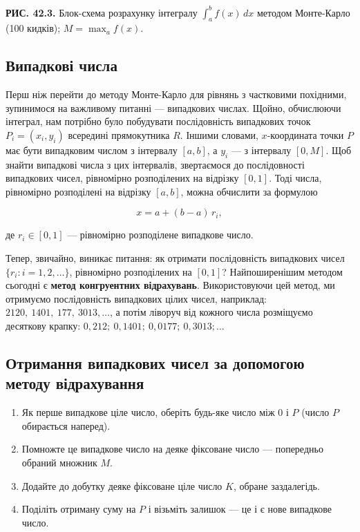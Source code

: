 \documentclass[
  ukrainian,
]{article}
\providecommand{\tightlist}{%
  \setlength{\itemsep}{0pt}\setlength{\parskip}{0pt}}
\begin{document}
\textbf{РИС. 42.3.} Блок-схема розрахунку інтегралу
\(\int_{a}^{b} f(x)\,dx\) методом Монте-Карло (100 кидків);
\(M = \max_a f(x)\).

\subsection{Випадкові
числа}\label{ux432ux438ux43fux430ux434ux43aux43eux432ux456-ux447ux438ux441ux43bux430}

Перш ніж перейти до методу Монте-Карло для рівнянь з частковими
похідними, зупинимося на важливому питанні --- випадкових числах. Щойно,
обчислюючи інтеграл, нам потрібно було побудувати послідовність
випадкових точок \(P_i = (x_i, y_i)\) всередині прямокутника \(R\).
Іншими словами, \(x\)-координата точки \(P\) має бути випадковим числом
з інтервалу \([a, b]\), а \(y_i\) --- з інтервалу \([0, M]\). Щоб знайти
випадкові числа з цих інтервалів, звертаємося до послідовності
випадкових чисел, рівномірно розподілених на відрізку \([0, 1]\). Тоді
числа, рівномірно розподілені на відрізку \([a, b]\), можна обчислити за
формулою

\[
x = a + (b - a)\,r_i,
\]

де \(r_i \in [0, 1]\) --- рівномірно розподілене випадкове число.

Тепер, звичайно, виникає питання: як отримати послідовність випадкових
чисел \(\{r_i: i=1,2,\ldots\}\), рівномірно розподілених на \([0,1]\)?
Найпоширенішим методом сьогодні є \textbf{метод конгруентних
відрахувань}. Використовуючи цей метод, ми отримуємо послідовність
випадкових цілих чисел, наприклад: \(2120,\ 1401,\ 177,\ 3013, \ldots\),
а потім ліворуч від кожного числа розміщуємо десяткову крапку:
\(0{,}212;\ 0{,}1401;\ 0{,}0177;\ 0{,}3013; \ldots\)

\subsection{Отримання випадкових чисел за допомогою методу
відрахування}\label{ux43eux442ux440ux438ux43cux430ux43dux43dux44f-ux432ux438ux43fux430ux434ux43aux43eux432ux438ux445-ux447ux438ux441ux435ux43b-ux437ux430-ux434ux43eux43fux43eux43cux43eux433ux43eux44e-ux43cux435ux442ux43eux434ux443-ux432ux456ux434ux440ux430ux445ux443ux432ux430ux43dux43dux44f}

\begin{enumerate}
\def\labelenumi{\arabic{enumi}.}
\tightlist
\item
  Як перше випадкове ціле число, оберіть будь-яке число між \(0\) і
  \(P\) (число \(P\) обирається наперед).
\item
  Помножте це випадкове число на деяке фіксоване число --- попередньо
  обраний множник \(M\).
\item
  Додайте до добутку деяке фіксоване ціле число \(K\), обране
  заздалегідь.
\item
  Поділіть отриману суму на \(P\) і візьміть залишок --- це і є нове
  випадкове число.
\end{enumerate}
\end{document}
